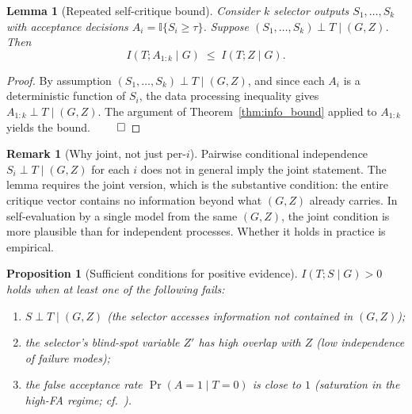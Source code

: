 \documentclass[11pt]{article}
\newtheorem{lemma}[theorem]{Lemma}
\newtheorem{proposition}[theorem]{Proposition}
\theoremstyle{definition}
\newtheorem{remark}[theorem]{Remark}
\begin{document}
\begin{lemma}[Repeated self-critique bound]
\label{lem:repeated}
Consider $k$ selector outputs $S_1, \ldots, S_k$ with acceptance decisions $A_i = \mathbb{I}\{S_i \geq \tau\}$. Suppose $(S_1, \ldots, S_k) \perp T \mid (G, Z)$. Then
\[
I(T; A_{1:k} \mid G) \;\leq\; I(T; Z \mid G).
\]
\end{lemma}
\begin{proof}
By assumption $(S_1, \ldots, S_k) \perp T \mid (G, Z)$, and since each $A_i$ is a deterministic function of $S_i$, the data processing inequality gives $A_{1:k} \perp T \mid (G, Z)$. The argument of Theorem~\ref{thm:info_bound} applied to $A_{1:k}$ yields the bound. $\hfill\qed$
\end{proof}

\begin{remark}[Why joint, not just per-$i$]
Pairwise conditional independence $S_i \perp T \mid (G, Z)$ for each $i$ does not in general imply the joint statement. The lemma requires the joint version, which is the substantive condition: the entire critique vector contains no information beyond what $(G, Z)$ already carries. In self-evaluation by a single model from the same $(G, Z)$, the joint condition is more plausible than for independent processes. Whether it holds in practice is empirical.
\end{remark}

\begin{proposition}[Sufficient conditions for positive evidence]
\label{prop:positive_evidence}
$I(T; S \mid G) > 0$ holds when at least one of the following fails:
\begin{enumerate}[label=(\roman*), nosep]
\item $S \perp T \mid (G, Z)$ (the selector accesses information not contained in $(G, Z)$);
\item the selector's blind-spot variable $Z'$ has high overlap with $Z$ (low independence of failure modes);
\item the false acceptance rate $\Pr(A=1 \mid T=0)$ is close to $1$ (saturation in the high-FA regime; cf.~\citealp{huang2024self}).
\end{enumerate}
\end{proposition}
\end{document}
